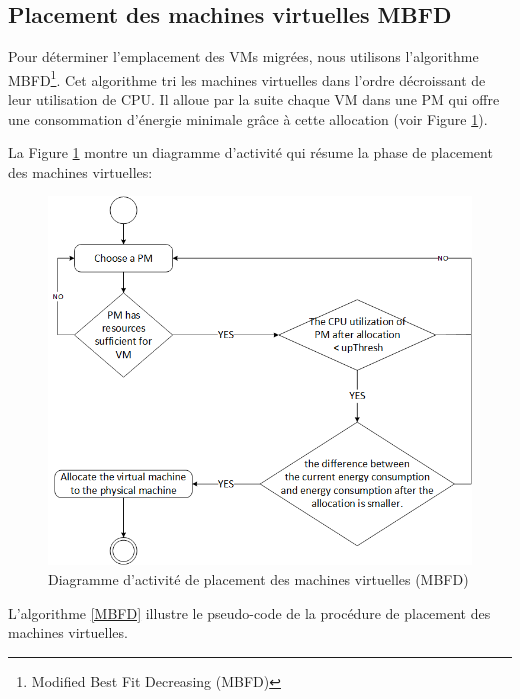 \subsection{Placement des machines virtuelles MBFD}
\begin{onehalfspace}
Pour déterminer l’emplacement des VMs migrées, nous utilisons l’algorithme MBFD\footnote{Modified Best Fit Decreasing (MBFD)}. Cet algorithme tri les  machines virtuelles dans l’ordre décroissant de leur utilisation de CPU. Il alloue  par la suite chaque VM dans une PM qui offre une consommation d’énergie minimale grâce à cette allocation (voir Figure \ref{DiAPl}).

La Figure \ref{DiAPl} montre un diagramme d’activité qui résume la phase de placement des machines virtuelles:

\begin{figure}[!h]
\begin{center}
\includegraphics[scale=0.5]{figures/8.png} 
\end{center}
\caption{Diagramme d'activité de placement des machines virtuelles (MBFD)}
\label{DiAPl}
\end{figure}
\medskip
L'algorithme \ref{MBFD} illustre le pseudo-code de la procédure  de placement des machines virtuelles. 
\clearpage
{}

\begin{algorithm}[!h]
\SetAlgoVlined


\end{algorithm}
\end{onehalfspace}
